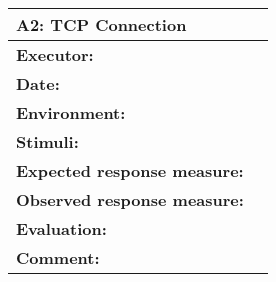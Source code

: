 \begin{tabular}{|m{}||m{}|}
\hline
\multicolumn{2}{|l|}{A2: TCP Connection} \\ \hline
\textbf{Executor:} & \\ \hline
\textbf{Date:} & \\ \hline
\textbf{Environment:} & \\ \hline
\textbf{Stimuli:} & \\ \hline
\textbf{Expected response measure:} & \\ \hline
\textbf{Observed response measure:} & \\ \hline
\textbf{Evaluation:} & \\ \hline
\textbf{Comment:} & \\ \hline
\end{tabular}